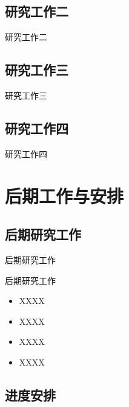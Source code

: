 \documentclass[compress]{beamer}
\begin{document}
\subsection{研究工作二}

\begin{frame}{研究工作二}

\end{frame}

\subsection{研究工作三}

\begin{frame}{研究工作三}

\end{frame}

\subsection{研究工作四}

\begin{frame}{研究工作四}

\end{frame}

\section{后期工作与安排}

\subsection{后期研究工作}

\begin{frame}{后期研究工作}
  \begin{block}{后期研究工作}
    \begin{itemize}
      \setlength{\itemsep}{6pt}
      \item XXXX
      \item XXXX
      \item XXXX
      \item XXXX
    \end{itemize}
  \end{block}
\end{frame}

\subsection{进度安排}
\end{document}
